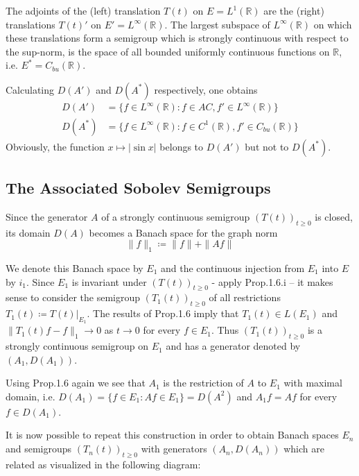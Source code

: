 \begin{example}[continued]\label{ex:a1-3.4}
The adjoints of the (left) translation $T(t)$ on $E = L^1(\mathbb{R})$ are the (right) translations $T(t)'$ on $E' = L^\infty(\mathbb{R})$.
The largest subspace of $L^\infty(\mathbb{R})$ on which these translations form a semigroup which is strongly continuous with respect to the sup-norm, is the space of all bounded uniformly continuous functions on $\mathbb{R}$, i.e. $E^* = C_{bu}(\mathbb{R})$.

Calculating $D(A')$ and $D(A^*)$ respectively, one obtains
\begin{align*}
    D(A') &= \{f \in L^\infty(\mathbb{R}) \colon f \in AC, f' \in L^\infty(\mathbb{R})\} \\
    D(A^*) &= \{f \in L^\infty(\mathbb{R}) \colon f \in C^1(\mathbb{R}), f' \in C_{bu}(\mathbb{R})\}
\end{align*}
Obviously, the function $x \mapsto |\sin x|$ belongs to $D(A')$ but not to $D(A^*)$.
\end{example}
\subsection{The Associated Sobolev Semigroups}\label{subsec:a1-3.5}

Since the generator $A$ of a strongly continuous semigroup $(T(t))_{t\geq 0}$ is closed, its domain $D(A)$ becomes a Banach space for the graph norm
\[
    \|f\|_1 \coloneqq \|f\| + \|Af\|
\]

We denote this Banach space by $E_1$ and the continuous injection from $E_1$ into $E$ by $i_1$.
Since $E_1$ is invariant under $(T(t))_{t\geq 0}$ - apply Prop.1.6.i -- it makes sense to consider the semigroup $(T_1(t))_{t\geq 0}$ of all restrictions $T_1(t) \coloneqq T(t)|_{E_1}$.
The results of Prop.1.6 imply that $T_1(t) \in L(E_1)$ and $\|T_1(t)f-f\|_1 \to 0$ as $t \to 0$ for every $f \in E_1$.
Thus $(T_1(t))_{t\geq 0}$ is a strongly continuous semigroup on $E_1$ and has a generator denoted by $(A_1,D(A_1))$.

Using Prop.1.6 again we see that $A_1$ is the restriction of $A$ to $E_1$ with maximal domain, i.e.
$D(A_{1}) = \{f \in E_{1} \colon Af \in E_{1}\} = D(A^{2})$ and
$A_{1}f = Af$ for every $f \in D(A_{1})$.

It is now possible to repeat this construction in order to obtain Banach spaces $E_{n}$ and semigroups $(T_{n}(t))_{t \geq 0}$ with generators $(A_{n},D(A_{n}))$ which are related as visualized in the following diagram:

